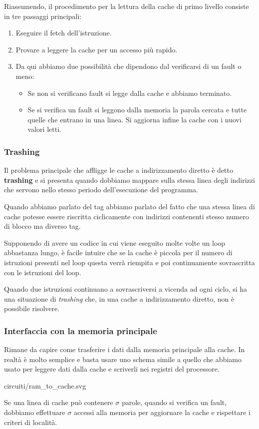 Riassumendo, il procedimento per la lettura della cache di primo livello consiste in tre passaggi
principali:
\begin{enumerate}
	\item Eseguire il fetch dell'istruzione.
	\item Provare a leggere la cache per un accesso più rapido.
	\item Da qui abbiamo due possibilità che dipendono dal verificarsi di un fault o meno:
	      \begin{itemize}
		      \item Se non si verificano fault si legge dalla cache e abbiamo terminato.
		      \item Se si verifica un fault si leggono dalla memoria la parola cercata e tutte
		            quelle che entrano in una linea. Si aggiorna infine la cache con i nuovi valori
		            letti.
	      \end{itemize}
\end{enumerate}

\subsubsection{Trashing}
Il problema principale che affligge le cache a indirizzamento diretto è detto \textbf{trashing} e
si presenta quando dobbiamo mappare sulla stessa linea degli indirizzi che servono nello stesso
periodo dell'esecuzione del programma.

Quando abbiamo parlato del tag abbiamo parlato del fatto che una stessa linea di cache potesse
essere riscritta ciclicamente con indirizzi contenenti stesso numero di blocco ma diverso tag.

Supponendo di avere un codice in cui viene eseguito molte volte un loop abbastanza lungo, è facile
intuire che se la cache è piccola per il numero di istruzioni presenti nel loop questa verrà
riempita e poi continuamente sovrascritta con le istruzioni del loop.

Quando due istruzioni continuano a sovrascriversi a vicenda ad ogni ciclo, si ha una situazione di
\emph{trashing} che, in una cache a indirizzamento diretto, non è possibile risolvere.

\subsubsection{Interfaccia con la memoria principale}
Rimane da capire come trasferire i dati dalla memoria principale alla cache. In realtà è molto
semplice e basta usare uno schema simile a quello che abbiamo usato per leggere dati dalla cache e
scriverli nei registri del processore.
\begin{center}
	 {circuiti/ram_to_cache.svg}
\end{center}
Se una linea di cache può contenere $\sigma$ parole, quando si verifica un fault, dobbiamo
effettuare $\sigma$ accessi alla memoria per aggiornare la cache e rispettare i criteri di località.

